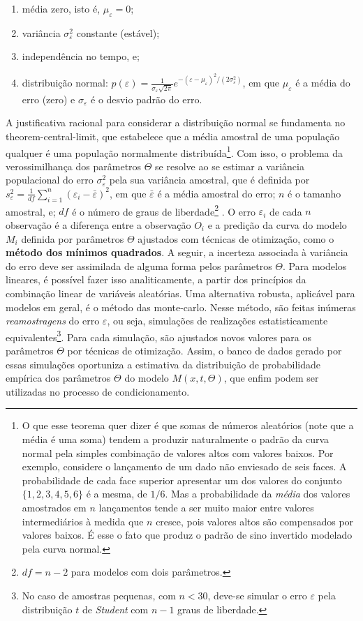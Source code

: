 \documentclass[./main.tex]{subfiles}
\begin{document}
\begin{enumerate}
    \item média zero, isto é, $\mu_{\varepsilon} = 0$;
    \item variância $\sigma_{\varepsilon}^2$ constante (estável);
    \item independência no tempo, e;
    \item distribuição normal: $p(\varepsilon) = \frac{1}{\sigma_{\varepsilon} \sqrt{2\pi}}e^{-(\varepsilon-\mu_{\varepsilon})^2/{(2\sigma_{\varepsilon}^2)}}$, em que $\mu_{\varepsilon}$ é a média do erro (zero) e $\sigma_{\varepsilon}$ é o desvio padrão do erro.
\end{enumerate}
A justificativa racional para considerar a distribuição normal se fundamenta no \gls{theorem-central-limit}, que estabelece que a média amostral de uma população qualquer é uma população normalmente distribuída\footnote{O que esse teorema quer dizer é que somas de números aleatórios (note que a média é uma soma) tendem a produzir naturalmente o padrão da curva normal pela simples combinação de valores altos com valores baixos. Por exemplo, considere o lançamento de um dado não enviesado de seis faces. A probabilidade de cada face superior apresentar um dos valores do conjunto $\{1, 2, 3, 4, 5, 6\}$ é a mesma, de $1/6$. Mas a probabilidade da \textit{média} dos valores amostrados em $n$ lançamentos tende a ser muito maior entre valores intermediários à medida que $n$ cresce, pois valores altos são compensados por valores baixos. É esse o fato que produz o padrão de sino invertido modelado pela curva normal.}. Com isso, o problema da verossimilhança dos parâmetros $\Theta$ se resolve ao se estimar a variância populacional do erro $\sigma^2_\varepsilon$ pela sua variância amostral, que é definida por $s^2_{\varepsilon} = \frac{1}{df}\sum_{i=1}^{n}({\varepsilon_i - \bar{\varepsilon}})^2$, em que $\bar{\varepsilon}$ é a média amostral do erro; $n$ é o tamanho amostral, e; $df$ é o número de graus de liberdade\footnote{$df = n-2$ para modelos com dois parâmetros.} \cite{graybill1994}. O erro $\varepsilon_i$ de cada $n$ observação é a diferença entre a observação $O_i$ e a predição da curva do modelo $M_i$ definida por parâmetros $\Theta$ ajustados com técnicas de otimização, como o \textbf{método dos mínimos quadrados}. A seguir, a incerteza associada à variância do erro deve ser assimilada de alguma forma pelos parâmetros $\Theta$. Para modelos lineares, é possível fazer isso analiticamente, a partir dos princípios da combinação linear de variáveis aleatórias. Uma alternativa robusta, aplicável para modelos em geral, é o método das \gls{monte-carlo}. Nesse método, são feitas inúmeras \textit{reamostragens} do erro $\varepsilon$, ou seja, simulações de realizações estatisticamente equivalentes\footnote{No caso de amostras pequenas, com $n < 30$, deve-se simular o erro $\varepsilon$ pela distribuição $t$ de \textit{Student} com $n-1$ graus de liberdade.}. Para cada simulação, são ajustados novos valores para os parâmetros $\Theta$ por técnicas de otimização. Assim, o banco de dados gerado por essas simulações oportuniza a estimativa da distribuição de probabilidade empírica dos parâmetros $\Theta$ do modelo $M(x, t, \Theta)$, que enfim podem ser utilizadas no processo de condicionamento. 
\end{document}

